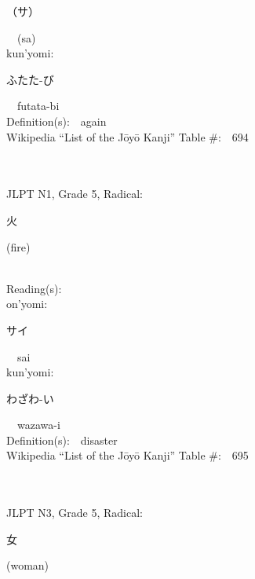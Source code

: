 \begin{multicols}{2}
{\hspace*{2em}}{\begin{CJK}{UTF8}{min} （サ） \end{CJK}}\ \ (sa)\ \ \\
{\hspace*{1em}}kun'yomi:\ \ \\
{\hspace*{2em}}{\begin{CJK}{UTF8}{min} ふたた-び \end{CJK}}\ \ futata-bi\ \ \\
Definition(s):\ \ again \\
Wikipedia ``List of the J\=oy\=o Kanji'' Table \#:\ \ 694 \\
\ \ \\
{\fontsize{34pt}{40pt}  }\ \ \\  %
{JLPT N1, Grade 5, Radical:\ \ {\begin{CJK}{UTF8}{min} 火 \end{CJK}} (fire) } \\
Reading(s):\ \ \\
{\hspace*{1em}}on'yomi:\ \ \\
{\hspace*{2em}}{\begin{CJK}{UTF8}{min} サイ \end{CJK}}\ \ sai\ \ \\
{\hspace*{1em}}kun'yomi:\ \ \\
{\hspace*{2em}}{\begin{CJK}{UTF8}{min} わざわ-い \end{CJK}}\ \ wazawa-i\ \ \\
Definition(s):\ \ disaster \\
Wikipedia ``List of the J\=oy\=o Kanji'' Table \#:\ \ 695 \\
\ \ \\
{\fontsize{34pt}{40pt}  }\ \ \\  %
{JLPT N3, Grade 5, Radical:\ \ {\begin{CJK}{UTF8}{min} 女 \end{CJK}} (woman) } \\

\end{multicols}
